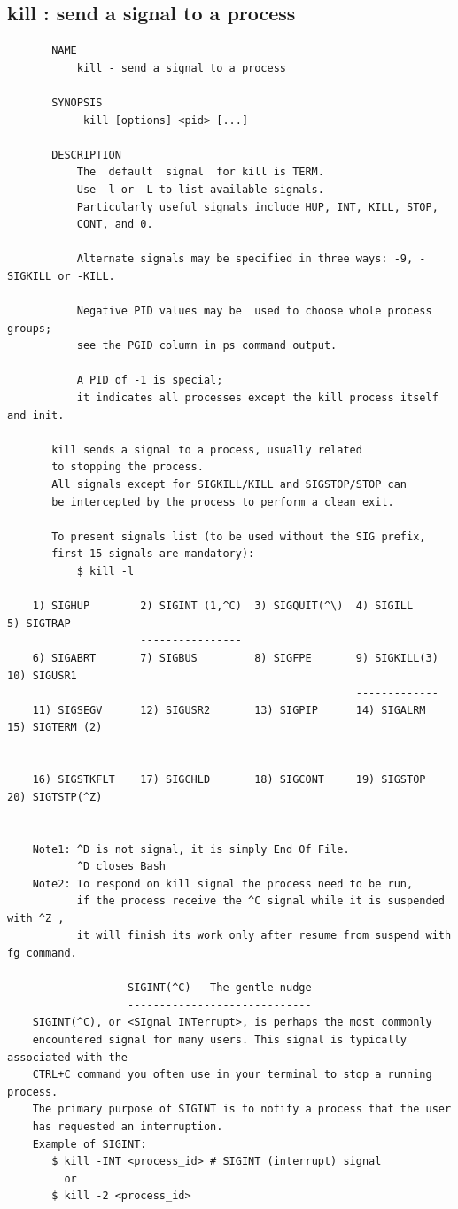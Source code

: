 \documentclass[a4paper,12pt]{article}
\begin{document}
\subsection{kill   : send a signal to a process  }
\begin{verbatim}
       NAME
           kill - send a signal to a process

       SYNOPSIS
            kill [options] <pid> [...]

       DESCRIPTION
           The  default  signal  for kill is TERM.  
           Use -l or -L to list available signals.
           Particularly useful signals include HUP, INT, KILL, STOP,
           CONT, and 0.   
           
           Alternate signals may be specified in three ways: -9, -SIGKILL or -KILL.  
           
           Negative PID values may be  used to choose whole process groups; 
           see the PGID column in ps command output.  
           
           A PID of -1 is special; 
           it indicates all processes except the kill process itself and init.

       kill sends a signal to a process, usually related
       to stopping the process.
       All signals except for SIGKILL/KILL and SIGSTOP/STOP can
       be intercepted by the process to perform a clean exit.

       To present signals list (to be used without the SIG prefix, 
       first 15 signals are mandatory): 
           $ kill -l
    
    1) SIGHUP        2) SIGINT (1,^C)  3) SIGQUIT(^\)  4) SIGILL       5) SIGTRAP
                     ----------------  
    6) SIGABRT       7) SIGBUS         8) SIGFPE       9) SIGKILL(3)  10) SIGUSR1
                                                       -------------    
    11) SIGSEGV      12) SIGUSR2       13) SIGPIP      14) SIGALRM     15) SIGTERM (2)
                                                                       ---------------
    16) SIGSTKFLT    17) SIGCHLD       18) SIGCONT     19) SIGSTOP     20) SIGTSTP(^Z)

    
    Note1: ^D is not signal, it is simply End Of File.
           ^D closes Bash
    Note2: To respond on kill signal the process need to be run, 
           if the process receive the ^C signal while it is suspended with ^Z ,
           it will finish its work only after resume from suspend with fg command.    
    
                   SIGINT(^C) - The gentle nudge
                   -----------------------------
    SIGINT(^C), or <SIgnal INTerrupt>, is perhaps the most commonly
    encountered signal for many users. This signal is typically associated with the    
    CTRL+C command you often use in your terminal to stop a running process. 
    The primary purpose of SIGINT is to notify a process that the user 
    has requested an interruption.
    Example of SIGINT:
       $ kill -INT <process_id> # SIGINT (interrupt) signal
         or       
       $ kill -2 <process_id>
       

\end{verbatim}
\end{document}
